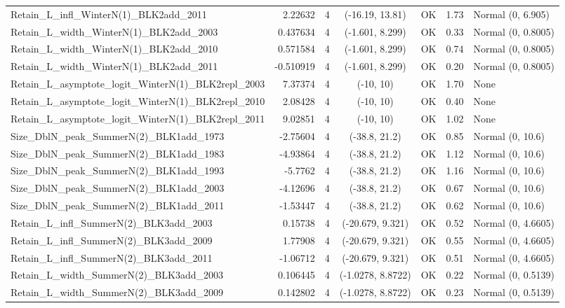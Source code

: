 \documentclass[12pt,]{article}
\begin{document}
\begin{landscape}
\begin{longtable}{lrcccll}
  Retain\_L\_infl\_WinterN(1)\_BLK2add\_2011 & 2.22632 & 4 & (-16.19, 13.81) & OK & 1.73 & Normal (0, 6.905) \\ 
  Retain\_L\_width\_WinterN(1)\_BLK2add\_2003 & 0.437634 & 4 & (-1.601, 8.299) & OK & 0.33 & Normal (0, 0.8005) \\ 
  Retain\_L\_width\_WinterN(1)\_BLK2add\_2010 & 0.571584 & 4 & (-1.601, 8.299) & OK & 0.74 & Normal (0, 0.8005) \\ 
  Retain\_L\_width\_WinterN(1)\_BLK2add\_2011 & -0.510919 & 4 & (-1.601, 8.299) & OK & 0.20 & Normal (0, 0.8005) \\ 
  Retain\_L\_asymptote\_logit\_WinterN(1)\_BLK2repl\_2003 & 7.37374 & 4 & (-10, 10) & OK & 1.70 & None \\ 
  Retain\_L\_asymptote\_logit\_WinterN(1)\_BLK2repl\_2010 & 2.08428 & 4 & (-10, 10) & OK & 0.40 & None \\ 
  Retain\_L\_asymptote\_logit\_WinterN(1)\_BLK2repl\_2011 & 9.02851 & 4 & (-10, 10) & OK & 1.02 & None \\ 
  Size\_DblN\_peak\_SummerN(2)\_BLK1add\_1973 & -2.75604 & 4 & (-38.8, 21.2) & OK & 0.85 & Normal (0, 10.6) \\ 
  Size\_DblN\_peak\_SummerN(2)\_BLK1add\_1983 & -4.93864 & 4 & (-38.8, 21.2) & OK & 1.12 & Normal (0, 10.6) \\ 
  Size\_DblN\_peak\_SummerN(2)\_BLK1add\_1993 & -5.7762 & 4 & (-38.8, 21.2) & OK & 1.16 & Normal (0, 10.6) \\ 
  Size\_DblN\_peak\_SummerN(2)\_BLK1add\_2003 & -4.12696 & 4 & (-38.8, 21.2) & OK & 0.67 & Normal (0, 10.6) \\ 
  Size\_DblN\_peak\_SummerN(2)\_BLK1add\_2011 & -1.53447 & 4 & (-38.8, 21.2) & OK & 0.62 & Normal (0, 10.6) \\ 
  Retain\_L\_infl\_SummerN(2)\_BLK3add\_2003 & 0.15738 & 4 & (-20.679, 9.321) & OK & 0.52 & Normal (0, 4.6605) \\ 
  Retain\_L\_infl\_SummerN(2)\_BLK3add\_2009 & 1.77908 & 4 & (-20.679, 9.321) & OK & 0.55 & Normal (0, 4.6605) \\ 
  Retain\_L\_infl\_SummerN(2)\_BLK3add\_2011 & -1.06712 & 4 & (-20.679, 9.321) & OK & 0.51 & Normal (0, 4.6605) \\ 
  Retain\_L\_width\_SummerN(2)\_BLK3add\_2003 & 0.106445 & 4 & (-1.0278, 8.8722) & OK & 0.22 & Normal (0, 0.5139) \\ 
  Retain\_L\_width\_SummerN(2)\_BLK3add\_2009 & 0.142802 & 4 & (-1.0278, 8.8722) & OK & 0.23 & Normal (0, 0.5139) \\ 

\end{longtable}
\end{landscape}
\end{document}
